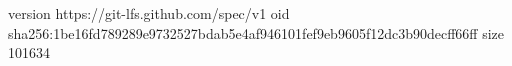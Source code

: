 version https://git-lfs.github.com/spec/v1
oid sha256:1be16fd789289e9732527bdab5e4af946101fef9eb9605f12dc3b90decff66ff
size 101634
